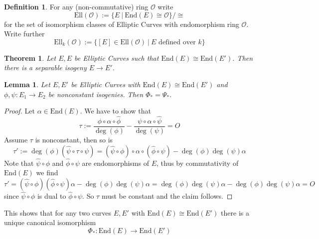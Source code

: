 \documentclass{scrartcl}
\newcommand{\End}{\mathrm{End}}
\newcommand{\Ell}{\mathrm{Ell}}
\renewcommand{\O}{O}
\newcommand{\Order}{\mathcal{O}}
\newtheorem{theorem}[prop]{Theorem}
\newtheorem{lemma}[prop]{Lemma}
\theoremstyle{definition}
\newtheorem{definition}[prop]{Definition}
\begin{document}
\begin{definition}
    For any (non-commutative) ring $\Order$ write
    \begin{equation*}
        \Ell(\Order) := \{ E \ | \ \End(E) \cong \Order \} / \cong
    \end{equation*}
    for the set of isomorphism classes of Elliptic Curves with endomorphism ring $\Order$.
    Write further
    \begin{equation*}
        \Ell_k(\Order) := \{ [E] \in \Ell(\Order) \ | \ \text{$E$ defined over $k$} \}
    \end{equation*}
\end{definition}
\begin{theorem}
    Let $E, E$ be Elliptic Curves such that $\End(E) \cong \End(E')$.
    Then there is a separable isogeny $E \to E'$.
\end{theorem}
\begin{lemma}
    Let $E, E'$ be Elliptic Curves with $\End(E) \cong \End(E')$ and $\phi, \psi: E_1 \to E_2$ be nonconstant isogenies.
    Then $\Phi_* = \Psi_*$.
\end{lemma}
\begin{proof}
    Let $\alpha \in \End(E)$. We have to show that
    \begin{equation*}
        \tau := \frac {\phi \circ \alpha \circ \hat{\phi}} {\deg(\phi)} - \frac {\psi \circ \alpha \circ \hat{\psi}} {\deg(\psi)} = \O
    \end{equation*}
    Assume $\tau$ is nonconstant, then so is
    \begin{equation*}
        \tau' := \deg(\phi) (\hat{\psi} \circ \tau \circ \psi) = (\hat{\psi} \circ \phi) \circ \alpha \circ (\hat{\phi} \circ \psi) - \deg(\phi)\deg(\psi) \alpha
    \end{equation*}
    Note that $\hat{\psi} \circ \phi$ and $\hat{\phi} \circ \psi$ are endomorphisms of $E$, thus by commutativity of $\End(E)$ we find
    \begin{equation*}
        \tau' = (\hat{\psi} \circ \phi) (\hat{\phi} \circ \psi) \alpha - \deg(\phi) \deg(\psi) \alpha = \deg(\phi) \deg(\psi) \alpha - \deg(\phi) \deg(\psi) \alpha = \O
    \end{equation*}
    since $\hat{\psi} \circ \phi$ is dual to $\hat{\phi} \circ \psi$.
    So $\tau$ must be constant and the claim follows.
\end{proof}
This shows that for any two curves $E, E'$ with $\End(E) \cong \End(E')$ there is a unique canonical isomorphism
\begin{equation*}
    \Phi_*: \End(E) \to \End(E')
\end{equation*}
\end{document}
